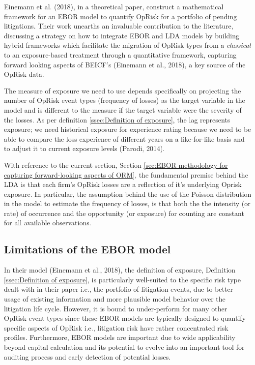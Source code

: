 \documentclass[]{DissertateUSU}
\begin{document}
Einemann et al. (2018), in a theoretical paper, construct a mathematical
framework for an EBOR model to quantify OpRisk for a portfolio of
pending litigations. Their work unearths an invaluable contribution to
the literature, discussing a strategy on how to integrate EBOR and LDA
models by building hybrid frameworks which facilitate the migration of
OpRisk types from a \emph{classical} to an exposure-based treatment
through a quantitative framework, capturing forward looking aspects of
BEICF's (Einemann et al., 2018), a key source of the OpRisk data.

The measure of exposure we need to use depends specifically on
projecting the number of OpRisk event types (frequency of losses) as the
target variable in the model and is different to the measure if the
target variable were the severity of the losses. As per definition
\ref{ssec:Definition of exposure}, the lag represents exposure; we need
historical exposure for experience rating because we need to be able to
compare the loss experience of different years on a like-for-like basis
and to adjust it to current exposure levels (Parodi, 2014).\medskip 

With reference to the current section, Section
\ref{sec:EBOR methodology for capturing forward-looking aspects of ORM},
the fundamental premise behind the LDA is that each firm's OpRisk losses
are a reflection of it's underlying Oprisk exposure. In particular, the
assumption behind the use of the Poisson distribution in the model to
estimate the frequency of losses, is that both the the intensity (or
rate) of occurrence and the opportunity (or exposure) for counting are
constant for all available observations.\medskip

\subsection{Limitations of the EBOR model}

In their model (Einemann et al., 2018), the definition of exposure,
Definition \ref{ssec:Definition of exposure}, is particularly
well-suited to the specific risk type dealt with in their paper i.e.,
the portfolio of litigation events, due to better usage of existing
information and more plausible model behavior over the litigation life
cycle. However, it is bound to under-perform for many other OpRisk event
types since these EBOR models are typically designed to quantify
specific aspects of OpRisk i.e., litigation risk have rather
concentrated risk profiles. Furthermore, EBOR models are important due
to wide applicability beyond capital calculation and its potential to
evolve into an important tool for auditing process and early detection
of potential losses.
\end{document}
